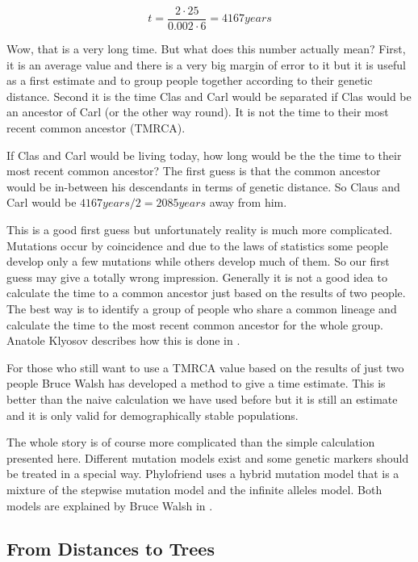 \begin{equation}
t = \frac{2 \cdot 25}{0.002 \cdot 6} = 4167 years
\end{equation}

Wow, that is a very long time. But what does this number
actually mean? First, it is an average value and there is
a very big margin of error to it but it is useful as a first
estimate and to group people together according to their
genetic distance. Second it is the time Clas and Carl would
be separated if Clas would be an ancestor of Carl (or the
other way round). It is not the time to their most recent
common ancestor (TMRCA).

If Clas and Carl would be living today, how long would be the
the time to their most recent common ancestor? The first guess
is that the common ancestor would be in-between his descendants
in terms of genetic distance. So Claus and Carl would be
$4167years / 2 = 2085years$ away from him. 

This is a good first guess but unfortunately reality is much
more complicated. Mutations occur by coincidence and due to
the laws of statistics some people develop only a few mutations
while others develop much of them. So our first guess may give
a totally wrong impression. Generally it is not a good idea to
calculate the time to a common ancestor just based on the results
of two people. The best way is to identify a group of people who
share a common lineage and calculate the time to the most recent
common ancestor for the whole group. Anatole Klyosov describes
how this is done in \cite{Kly09}.

For those who still want to use a TMRCA value based on the results
of just two people Bruce Walsh has developed a method to give
a time estimate\cite{Wal01}. This is better than the naive
calculation we have used before but it is still an estimate and
it is only valid for demographically stable populations.

The whole story is of course more complicated than the simple
calculation presented here. Different mutation models exist
and some genetic markers should be treated in a special way.
Phylofriend uses a hybrid mutation model that is a mixture
of the stepwise mutation model and the infinite alleles model.
Both models are explained by Bruce Walsh in \cite{Wal02}.


\subsection{From Distances to Trees}

